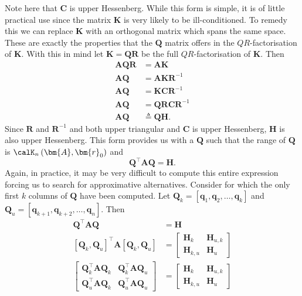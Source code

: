 Note here that $\bm{C}$ is upper Hessenberg. While this form is simple, it is of little practical use since the matrix $\bm{K}$ is very likely to be ill-conditioned. To remedy this we can replace $\bm{K}$ with an orthogonal matrix which spans the same space. These are exactly the properties that the $\bm{Q}$ matrix offers in the $QR$-factorisation of $\bm{K}$. With this in mind let $\bm{K} = \bm{Q} \bm{R}$ be the full $QR$-factorisation of $\bm{K}$. Then
\begin{align*}
    \bm{A} \bm{Q} \bm{R} & = \bm{A} \bm{K}                    \\
    \bm{A} \bm{Q}        & = \bm{A} \bm{K} \bm{R}^{-1}        \\
    \bm{A} \bm{Q}        & = \bm{K} \bm{C} \bm{R}^{-1}        \\
    \bm{A} \bm{Q}        & = \bm{Q} \bm{R} \bm{C} \bm{R}^{-1} \\
    \bm{A} \bm{Q}        & \triangleq \bm{Q} \bm{H}.
\end{align*}
Since $\bm{R}$ and $\bm{R}^{-1}$ and both upper triangular and $\bm{C}$ is upper Hessenberg, $\bm{H}$ is also upper Hessenberg. This form provides us with a $\bm{Q}$ such that the range of $\bm{Q}$ is $\calK_{n} \left( \bm{A}, \bm{r}_0 \right)$ and
\begin{equation}\label{eq: QTAQ_eq_H}
    \bm{Q}^{\intercal} \bm{A} \bm{Q} = \bm{H}.
\end{equation}
Again, in practice, it may be very difficult to compute this entire expression forcing us to search for approximative alternatives. Consider  for which the only first $k$ columns of $\bm{Q}$ have been computed. Let $\bm{Q}_k = \left[ \bm{q}_1 , \bm{q}_2 , \ldots , \bm{q}_k \right]$ and $\bm{Q}_u = \left[ \bm{q}_{k+1} , \bm{q}_{k+2} , \ldots , \bm{q}_{n} \right]$. Then
\begin{align*}
    \bm{Q}^{\intercal} \bm{A} \bm{Q}                                                         & = \bm{H} \\
    \left[ \bm{Q}_k , \bm{Q}_u \right]^{\intercal} \bm{A} \left[ \bm{Q}_k , \bm{Q}_u \right] & =
    \begin{bmatrix}
        \bm{H}_k     & \bm{H}_{u,k} \\
        \bm{H}_{k,u} & \bm{H}_{u}
    \end{bmatrix}                                                                           \\
    \begin{bmatrix}
        \bm{Q}_{k}^{\intercal} \bm{A} \bm{Q}_{k} & \bm{Q}_{k}^{\intercal} \bm{A} \bm{Q}_{u} \\
        \bm{Q}_{u}^{\intercal} \bm{A} \bm{Q}_{k} & \bm{Q}_{u}^{\intercal} \bm{A} \bm{Q}_{u}
    \end{bmatrix}
                                                                                             & =
    \begin{bmatrix}
        \bm{H}_k     & \bm{H}_{u,k} \\
        \bm{H}_{k,u} & \bm{H}_{u}
    \end{bmatrix}
\end{align*}
